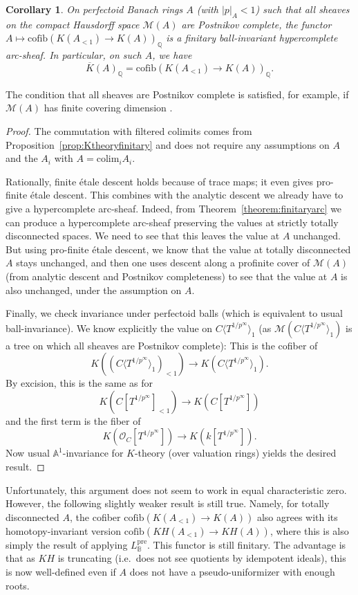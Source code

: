 \documentclass[11pt]{amsart}
\numberwithin{equation}{section}
\numberwithin{theorem}{section}
\newtheorem{corollary}[theorem]{Corollary}
\theoremstyle{definition}
\begin{document}
\begin{corollary} On perfectoid Banach rings $A$ (with $|p|_A<1$) such that all sheaves on the compact Hausdorff space $\mathcal M(A)$ are Postnikov complete, the functor $A\mapsto \mathrm{cofib}(K(A_{<1})\to K(A))_{\mathbb Q}$ is a finitary ball-invariant hypercomplete arc-sheaf. In particular, on such $A$, we have
\[
\overline{K}(A)_{\mathbb Q} = \mathrm{cofib}(K(A_{<1})\to K(A))_{\mathbb Q}.
\]
\end{corollary}

The condition that all sheaves are Postnikov complete is satisfied, for example, if $\mathcal M(A)$ has finite covering dimension \cite[Proposition 7.2.1.10]{LurieHTT}.

\begin{proof} The commutation with filtered colimits comes from Proposition~\ref{prop:Ktheoryfinitary} and does not require any assumptions on $A$ and the $A_i$ with $A=\mathrm{colim}_i A_i$.

Rationally, finite \'etale descent holds because of trace maps; it even gives pro-finite \'etale descent. This combines with the analytic descent we already have to give a hypercomplete arc-sheaf. Indeed, from Theorem~\ref{theorem:finitaryarc} we can produce a hypercomplete arc-sheaf preserving the values at strictly totally disconnected spaces. We need to see that this leaves the value at $A$ unchanged. But using pro-finite \'etale descent, we know that the value at totally disconnected $A$ stays unchanged, and then one uses descent along a profinite cover of $\mathcal M(A)$ (from analytic descent and Postnikov completeness) to see that the value at $A$ is also unchanged, under the assumption on $A$.

Finally, we check invariance under perfectoid balls (which is equivalent to usual ball-invariance). We know explicitly the value on $C\langle T^{1/p^\infty}\rangle_1$ (as $\mathcal M(C\langle T^{1/p^\infty}\rangle_1)$ is a tree on which all sheaves are Postnikov complete): This is the cofiber of
\[
K((C\langle T^{1/p^\infty}\rangle_1)_{<1})\to K(C\langle T^{1/p^\infty}\rangle_1).
\]
By excision, this is the same as for
\[
K(C[T^{1/p^\infty}]_{<1})\to K(C[T^{1/p^\infty}])
\]
and the first term is the fiber of
\[
K(\mathcal O_C[T^{1/p^\infty}])\to K(k[T^{1/p^\infty}]).
\]
Now usual $\mathbb A^1$-invariance for $K$-theory (over valuation rings) yields the desired result.
\end{proof}

Unfortunately, this argument does not seem to work in equal characteristic zero. However, the following slightly weaker result is still true. Namely, for totally disconnected $A$, the cofiber $\mathrm{cofib}(K(A_{<1})\to K(A))$ also agrees with its homotopy-invariant version $\mathrm{cofib}(KH(A_{<1})\to KH(A))$, where this is also simply the result of applying $L_{\mathbb B}^{\mathrm{pre}}$. This functor is still finitary. The advantage is that as $KH$ is truncating (i.e.~does not see quotients by idempotent ideals), this is now well-defined even if $A$ does not have a pseudo-uniformizer with enough roots.
\end{document}
